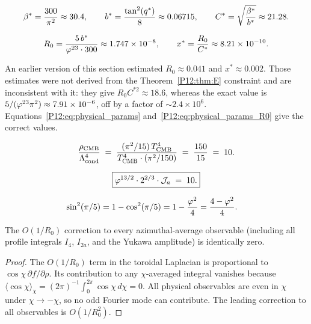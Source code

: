 \begin{equation}
  \beta^{*} = \frac{300}{\pi^2} \approx 30.4,
  \qquad
  b^* = \frac{\tan^2(q^*)}{8} \approx 0.06715,
  \qquad
  C^* = \sqrt{\frac{\beta^{*}}{b^*}} \approx 21.28.
  \label{P12:eq:physical_params}
\end{equation}

\begin{equation}
  R_0 = \frac{5\,b^*}{\varphi^{23}\cdot 300} \approx 1.747\times10^{-8},
  \qquad
  x^* = \frac{R_0}{C^*} \approx 8.21\times10^{-10}.
  \label{P12:eq:physical_params_R0}
\end{equation}

\begin{remark}
\label{P12:rem:phys_correction}
An earlier version of this section estimated $R_0\approx0.041$ and
$x^*\approx0.002$. Those estimates were not derived from
the Theorem~\ref{P12:thm:E} constraint and are inconsistent with it:
they give $R_0 C^{*2}\approx18.6$, whereas the exact value is
$5/(\varphi^{23}\pi^2)\approx7.91\times10^{-6}$, off by a factor
of $\sim2.4\times10^6$. Equations~\eqref{P12:eq:physical_params}
and~\eqref{P12:eq:physical_params_R0} give the correct values.
\end{remark}

\begin{equation}
  \frac{\rho_{\mathrm{CMB}}}{\Lambda_{\mathrm{cond}}^4}
  \;=\;
  \frac{(\pi^2/15)\,T_{\mathrm{CMB}}^4}{T_{\mathrm{CMB}}^4\cdot(\pi^2/150)}
  \;=\;
  \frac{150}{15} \;=\; 10.
  \label{P12:eq:ratio_proof}
\end{equation}

\begin{equation}
  \boxed{
  \varphi^{13/2}\cdot2^{2/3}\cdot\mathcal{J}_a \;=\; 10.
  }
  \label{P12:eq:reduced}
\end{equation}

\begin{align}
  \sin^2(\pi/5) &= 1 - \cos^2(\pi/5) = 1 - \frac{\varphi^2}{4}
  = \frac{4-\varphi^2}{4}.
  \label{P12:eq:sin2_proof}
\end{align}

\begin{lemma}
\label{P14:lem:O1R_vanishes}
The $O(1/R_0)$ correction to every azimuthal-average observable
(including all profile integrals $I_4$, $I_{2a}$, and the Yukawa amplitude)
is identically zero.
\begin{proof}
The $O(1/R_0)$ term in the toroidal Laplacian is proportional to
$\cos\chi\,\partial f/\partial\rho$.
Its contribution to any $\chi$-averaged integral vanishes because
$\langle\cos\chi\rangle_\chi = (2\pi)^{-1}\int_0^{2\pi}\cos\chi\,d\chi = 0$.
All physical observables are even in $\chi$ under $\chi\to-\chi$,
so no odd Fourier mode can contribute.
The leading correction to all observables is $O(1/R_0^2)$.
\end{proof}
\end{lemma}

